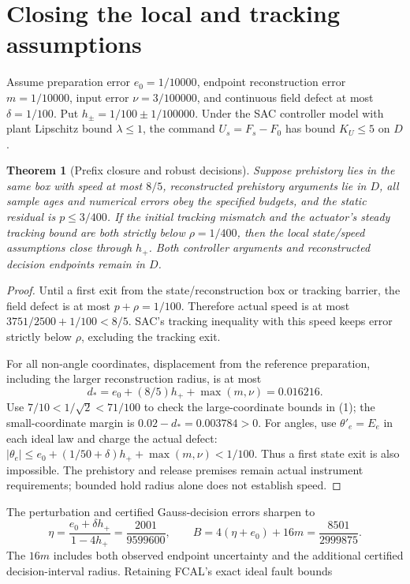 \documentclass[10pt,a4paper]{article}
\newtheorem{theorem}{Theorem}
\begin{document}
\section{Closing the local and tracking assumptions}
Assume preparation error $e_0=1/10000$, endpoint reconstruction error $m=1/10000$, input error $\nu=3/100000$, and continuous field defect at most $\delta=1/100$. Put $h_\pm=1/100\pm1/100000$. Under the SAC controller model with plant Lipschitz bound $\lambda\leq1$, the command $U_s=F_s-F_0$ has bound $K_U\leq5$ on $D$.

\begin{theorem}[Prefix closure and robust decisions]
Suppose prehistory lies in the same box with speed at most $8/5$, reconstructed prehistory arguments lie in $D$, all sample ages and numerical errors obey the specified budgets, and the static residual is $p\leq3/400$. If the initial tracking mismatch and the actuator's steady tracking bound are both strictly below $\rho=1/400$, then the local state/speed assumptions close through $h_+$. Both controller arguments and reconstructed decision endpoints remain in $D$.
\end{theorem}
\begin{proof}
Until a first exit from the state/reconstruction box or tracking barrier, the field defect is at most $p+\rho=1/100$. Therefore actual speed is at most $3751/2500+1/100<8/5$. SAC's tracking inequality with this speed keeps error strictly below $\rho$, excluding the tracking exit.

For all non-angle coordinates, displacement from the reference preparation, including the larger reconstruction radius, is at most
\[
d_* = e_0+(8/5)h_++\max(m,\nu)=0.016216.
\]
Use $7/10<1/\sqrt2<71/100$ to check the large-coordinate bounds in (1); the small-coordinate margin is $0.02-d_*=0.003784>0$. For angles, use $\theta'_e=E_e$ in each ideal law and charge the actual defect:
$|\theta_e|\leq e_0+(1/50+\delta)h_++\max(m,\nu)<1/100$.
Thus a first state exit is also impossible. The prehistory and release premises remain actual instrument requirements; bounded hold radius alone does not establish speed.
\end{proof}
The perturbation and certified Gauss-decision errors sharpen to
\begin{equation}
\eta=\frac{e_0+\delta h_+}{1-4h_+}=\frac{2001}{9599600},
\qquad B=4(\eta+e_0)+16m=\frac{8501}{2999875}.
\end{equation}
The $16m$ includes both observed endpoint uncertainty and the additional certified decision-interval radius. Retaining FCAL's exact ideal fault bounds
\end{document}
